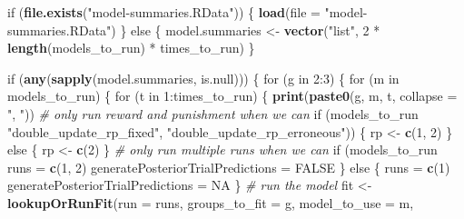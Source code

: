 \documentclass[]{article}
\newenvironment{Shaded}{\begin{snugshade}}{\end{snugshade}}
\newcommand{\KeywordTok}[1]{\textcolor[rgb]{0.13,0.29,0.53}{\textbf{{#1}}}}
\newcommand{\DataTypeTok}[1]{\textcolor[rgb]{0.13,0.29,0.53}{{#1}}}
\newcommand{\DecValTok}[1]{\textcolor[rgb]{0.00,0.00,0.81}{{#1}}}
\newcommand{\StringTok}[1]{\textcolor[rgb]{0.31,0.60,0.02}{{#1}}}
\newcommand{\CommentTok}[1]{\textcolor[rgb]{0.56,0.35,0.01}{\textit{{#1}}}}
\newcommand{\OtherTok}[1]{\textcolor[rgb]{0.56,0.35,0.01}{{#1}}}
\newcommand{\NormalTok}[1]{{#1}}
\begin{document}
\begin{Shaded}
\begin{Highlighting}[]
\NormalTok{if (}\KeywordTok{file.exists}\NormalTok{(}\StringTok{"model-summaries.RData"}\NormalTok{)) \{}
    \KeywordTok{load}\NormalTok{(}\DataTypeTok{file =} \StringTok{"model-summaries.RData"}\NormalTok{)}
\NormalTok{\} else \{}
    \NormalTok{model.summaries <-}\StringTok{ }\KeywordTok{vector}\NormalTok{(}\StringTok{"list"}\NormalTok{, }\DecValTok{2} \NormalTok{*}\StringTok{ }\KeywordTok{length}\NormalTok{(models_to_run) *}\StringTok{ }\NormalTok{times_to_run)}
\NormalTok{\}}

\NormalTok{if (}\KeywordTok{any}\NormalTok{(}\KeywordTok{sapply}\NormalTok{(model.summaries, is.null))) \{}
    \NormalTok{for (g in }\DecValTok{2}\NormalTok{:}\DecValTok{3}\NormalTok{) \{}
        \NormalTok{for (m in models_to_run) \{}
            \NormalTok{for (t in }\DecValTok{1}\NormalTok{:times_to_run) \{}
                \KeywordTok{print}\NormalTok{(}\KeywordTok{paste0}\NormalTok{(g, m, t, }\DataTypeTok{collapse =} \StringTok{", "}\NormalTok{))}
                \CommentTok{# only run reward and punishment when we can}
                \NormalTok{if (models_to_run %
                  \StringTok{"double_update_rp_fixed"}\NormalTok{, }\StringTok{"double_update_rp_erroneous"}\NormalTok{)) \{}
                  \NormalTok{rp <-}\StringTok{ }\KeywordTok{c}\NormalTok{(}\DecValTok{1}\NormalTok{, }\DecValTok{2}\NormalTok{)}
                \NormalTok{\} else \{}
                  \NormalTok{rp <-}\StringTok{ }\KeywordTok{c}\NormalTok{(}\DecValTok{2}\NormalTok{)}
                \NormalTok{\}}
                \CommentTok{# only run multiple runs when we can}
                \NormalTok{if (models_to_run %
                  \NormalTok{runs =}\StringTok{ }\KeywordTok{c}\NormalTok{(}\DecValTok{1}\NormalTok{, }\DecValTok{2}\NormalTok{)}
                  \NormalTok{generatePosteriorTrialPredictions =}\StringTok{ }\OtherTok{FALSE}
                \NormalTok{\} else \{}
                  \NormalTok{runs =}\StringTok{ }\KeywordTok{c}\NormalTok{(}\DecValTok{1}\NormalTok{)}
                  \NormalTok{generatePosteriorTrialPredictions =}\StringTok{ }\OtherTok{NA}
                \NormalTok{\}}
                \CommentTok{# run the model}
                \NormalTok{fit <-}\StringTok{ }\KeywordTok{lookupOrRunFit}\NormalTok{(}\DataTypeTok{run =} \NormalTok{runs, }\DataTypeTok{groups_to_fit =} \NormalTok{g, }\DataTypeTok{model_to_use =} \NormalTok{m, }
}}
\end{Highlighting}
\end{Shaded}
\end{document}
